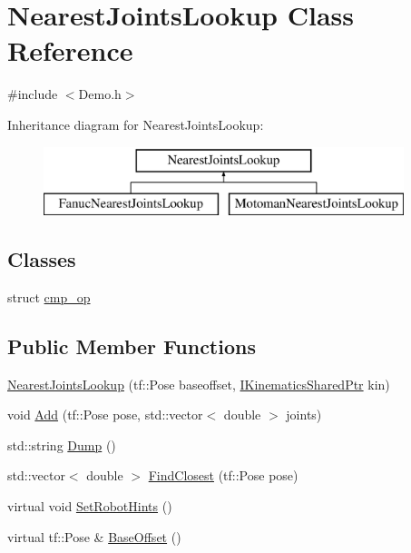 \hypertarget{classNearestJointsLookup}{\section{Nearest\-Joints\-Lookup Class Reference}
\label{classNearestJointsLookup}
}


{\ttfamily \#include $<$Demo.\-h$>$}

Inheritance diagram for Nearest\-Joints\-Lookup\-:\begin{figure}[H]
\begin{center}
\leavevmode
\includegraphics[height=2.000000cm]{classNearestJointsLookup}
\end{center}
\end{figure}
\subsection*{Classes}
\begin{DoxyCompactItemize}
\item 
struct \hyperlink{structNearestJointsLookup_1_1cmp__op}{cmp\-\_\-op}
\end{DoxyCompactItemize}
\subsection*{Public Member Functions}
\begin{DoxyCompactItemize}
\item 
\hyperlink{classNearestJointsLookup_a673f814d2dafadeea5de0b2be2a3e699}{Nearest\-Joints\-Lookup} (tf\-::\-Pose baseoffset, \hyperlink{Kinematics_8h_aa720b9842c846588baf215581fb9f902}{I\-Kinematics\-Shared\-Ptr} kin)
\item 
void \hyperlink{classNearestJointsLookup_a4caf4d38af280021358a2f4f75d568b6}{Add} (tf\-::\-Pose pose, std\-::vector$<$ double $>$ joints)
\item 
std\-::string \hyperlink{classNearestJointsLookup_a5f67201a509a3b440170c5244778ba6c}{Dump} ()
\item 
std\-::vector$<$ double $>$ \hyperlink{classNearestJointsLookup_ab04dfb6a7eb78a8029c6363472b16de9}{Find\-Closest} (tf\-::\-Pose pose)
\item 
virtual void \hyperlink{classNearestJointsLookup_a833cff3f82b12344d2142690e6216340}{Set\-Robot\-Hints} ()
\item 
virtual tf\-::\-Pose \& \hyperlink{classNearestJointsLookup_a7778e108bdccb4e4326de66f4ed36523}{Base\-Offset} ()
\end{DoxyCompactItemize}
